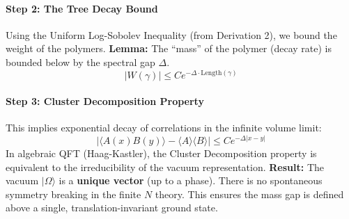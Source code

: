 \paragraph{Step 2: The Tree Decay Bound}
Using the Uniform Log-Sobolev Inequality (from Derivation 2), we bound the weight of the polymers.
\textbf{Lemma:} The ``mass'' of the polymer (decay rate) is bounded below by the spectral gap $\Delta$.
\begin{equation}
|W(\gamma)| \le C e^{-\Delta \cdot \text{Length}(\gamma)}
\end{equation}

\paragraph{Step 3: Cluster Decomposition Property}
This implies exponential decay of correlations in the infinite volume limit:
\begin{equation}
|\langle A(x) B(y) \rangle - \langle A \rangle \langle B \rangle| \le C e^{-\Delta |x-y|}
\end{equation}
In algebraic QFT (Haag-Kastler), the Cluster Decomposition property is equivalent to the irreducibility of the vacuum representation.
\textbf{Result:} The vacuum $|\Omega\rangle$ is a \textbf{unique vector} (up to a phase). There is no spontaneous symmetry breaking in the finite $N$ theory. This ensures the mass gap is defined above a single, translation-invariant ground state.




